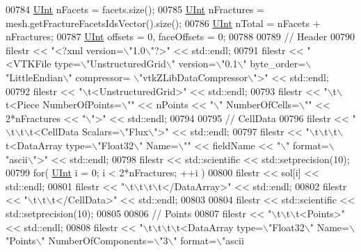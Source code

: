 \begin{DoxyCode}
00784     \hyperlink{namespaceFVCode3D_a4bf7e328c75d0fd504050d040ebe9eda}{UInt} nFacets = facets.size();
00785     \hyperlink{namespaceFVCode3D_a4bf7e328c75d0fd504050d040ebe9eda}{UInt} nFractures = mesh.getFractureFacetsIdsVector().size();
00786     \hyperlink{namespaceFVCode3D_a4bf7e328c75d0fd504050d040ebe9eda}{UInt} nTotal = nFacets + nFractures;
00787     \hyperlink{namespaceFVCode3D_a4bf7e328c75d0fd504050d040ebe9eda}{UInt} offsets = 0, faceOffsets = 0;
00788 
00789     \textcolor{comment}{// Header}
00790     filestr << \textcolor{stringliteral}{"<?xml version=\(\backslash\)"1.0\(\backslash\)"?>"} << std::endl;
00791     filestr << \textcolor{stringliteral}{"<VTKFile type=\(\backslash\)"UnstructuredGrid\(\backslash\)" version=\(\backslash\)"0.1\(\backslash\)" byte\_order=\(\backslash\)"LittleEndian\(\backslash\)" compressor=
      \(\backslash\)"vtkZLibDataCompressor\(\backslash\)">"} << std::endl;
00792     filestr << \textcolor{stringliteral}{"\(\backslash\)t<UnstructuredGrid>"} << std::endl;
00793     filestr << \textcolor{stringliteral}{"\(\backslash\)t\(\backslash\)t<Piece NumberOfPoints=\(\backslash\)""} << nPoints << \textcolor{stringliteral}{"\(\backslash\)" NumberOfCells=\(\backslash\)""} << 2*nFractures << \textcolor{stringliteral}{"\(\backslash\)">"} 
      << std::endl;
00794 
00795     \textcolor{comment}{// CellData}
00796     filestr << \textcolor{stringliteral}{"\(\backslash\)t\(\backslash\)t\(\backslash\)t<CellData Scalars=\(\backslash\)"Flux\(\backslash\)">"} << std::endl;
00797     filestr << \textcolor{stringliteral}{"\(\backslash\)t\(\backslash\)t\(\backslash\)t\(\backslash\)t<DataArray type=\(\backslash\)"Float32\(\backslash\)" Name=\(\backslash\)""} << fieldName << \textcolor{stringliteral}{"\(\backslash\)" format=\(\backslash\)"ascii\(\backslash\)">"} << 
      std::endl;
00798     filestr << std::scientific << std::setprecision(10);
00799     \textcolor{keywordflow}{for}( \hyperlink{namespaceFVCode3D_a4bf7e328c75d0fd504050d040ebe9eda}{UInt} i = 0; i < 2*nFractures; ++i )
00800         filestr << sol[i] << std::endl;
00801     filestr << \textcolor{stringliteral}{"\(\backslash\)t\(\backslash\)t\(\backslash\)t\(\backslash\)t</DataArray>"} << std::endl;
00802     filestr << \textcolor{stringliteral}{"\(\backslash\)t\(\backslash\)t\(\backslash\)t</CellData>"} << std::endl;
00803 
00804     filestr << std::scientific << std::setprecision(10);
00805 
00806     \textcolor{comment}{// Points}
00807     filestr << \textcolor{stringliteral}{"\(\backslash\)t\(\backslash\)t\(\backslash\)t<Points>"} << std::endl;
00808     filestr << \textcolor{stringliteral}{"\(\backslash\)t\(\backslash\)t\(\backslash\)t\(\backslash\)t<DataArray type=\(\backslash\)"Float32\(\backslash\)" Name=\(\backslash\)"Points\(\backslash\)" NumberOfComponents=\(\backslash\)"3\(\backslash\)" format=\(\backslash\)"ascii
}
\end{DoxyCode}
